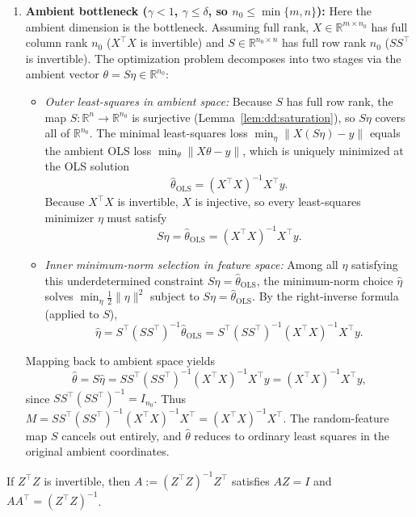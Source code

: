 \begin{remark}
\begin{enumerate}
  \item \textbf{Ambient bottleneck ($\gamma<1$, $\gamma\le\delta$, so $n_0\le\min\{m,n\}$):}
  Here the ambient dimension is the bottleneck. Assuming full rank, $X\in\mathbb R^{m\times n_0}$ has full column rank $n_0$ ($X^\top X$ is invertible) and $S\in\mathbb R^{n_0\times n}$ has full row rank $n_0$ ($SS^\top$ is invertible).
  The optimization problem decomposes into two stages via the ambient vector $\theta=S\eta\in\mathbb R^{n_0}$:
  \begin{itemize}
    \item \emph{Outer least-squares in ambient space:} Because $S$ has full row rank, the map $S:\mathbb R^n\to\mathbb R^{n_0}$ is surjective (Lemma~\ref{lem:dd:saturation}), so $S\eta$ covers all of $\mathbb R^{n_0}$. The minimal least-squares loss $\min_\eta\|X(S\eta)-y\|$ equals the ambient OLS loss $\min_\theta\|X\theta-y\|$, which is uniquely minimized at the OLS solution
    \[
      \hat\theta_{\mathrm{OLS}} = (X^\top X)^{-1}X^\top y.
    \]
    Because $X^\top X$ is invertible, $X$ is injective, so every least-squares minimizer $\eta$ must satisfy
    \[
      S\eta = \hat\theta_{\mathrm{OLS}} = (X^\top X)^{-1}X^\top y.
    \]
    \item \emph{Inner minimum-norm selection in feature space:} Among all $\eta$ satisfying this underdetermined constraint $S\eta=\hat\theta_{\mathrm{OLS}}$, the minimum-norm choice $\hat\eta$ solves $\min_\eta\tfrac12\|\eta\|^2$ subject to $S\eta=\hat\theta_{\mathrm{OLS}}$. By the right-inverse formula (applied to $S$),
    \[
      \hat\eta = S^\top(SS^\top)^{-1}\hat\theta_{\mathrm{OLS}} = S^\top(SS^\top)^{-1}(X^\top X)^{-1}X^\top y.
    \]
  \end{itemize}
  Mapping back to ambient space yields
  \[
    \hat\theta = S\hat\eta = SS^\top(SS^\top)^{-1}(X^\top X)^{-1}X^\top y = (X^\top X)^{-1}X^\top y,
  \]
  since $SS^\top(SS^\top)^{-1}=I_{n_0}$. Thus $M = SS^\top(SS^\top)^{-1}(X^\top X)^{-1}X^\top = (X^\top X)^{-1}X^\top$. The random-feature map $S$ cancels out entirely, and $\hat\theta$ reduces to ordinary least squares in the original ambient coordinates.
\end{enumerate}
\end{remark}

\begin{lemma}\label{lem:dd:leftInverse}
  \leanok
If $Z^\top Z$ is invertible, then $A:=(Z^\top Z)^{-1}Z^\top$ satisfies $AZ=I$ and $AA^\top=(Z^\top Z)^{-1}$.
\end{lemma}

